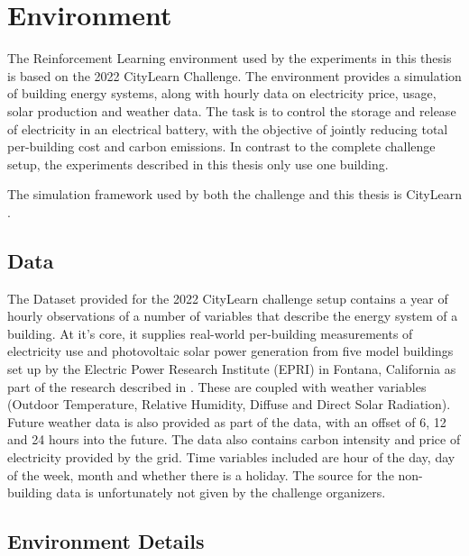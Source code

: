 \section{Environment}
The Reinforcement Learning environment used by the experiments in this thesis is based on the 2022 CityLearn Challenge.
The environment provides a simulation of building energy systems, along with hourly data on electricity price, usage, solar production and weather data.
The task is to control the storage and release of electricity in an electrical battery, with the objective of jointly reducing total per-building cost and carbon emissions.
In contrast to the complete challenge setup, the experiments described in this thesis only use one building.

The simulation framework used by both the challenge and this thesis is CityLearn \cite{vazquez-canteli2019CityLearnV1OpenAI}.

\subsection{Data}
The Dataset provided for the 2022 CityLearn challenge setup contains a year of hourly observations of a number of variables that describe the energy system of a building.
At it's core, it supplies real-world per-building measurements of electricity use and photovoltaic solar power generation from five model buildings set up by the Electric Power Research Institute (EPRI) in Fontana, California as part of the research described in \cite{narayanamurthyGridIntegrationZero}.
These are coupled with weather variables (Outdoor Temperature, Relative Humidity, Diffuse and Direct Solar Radiation).
Future weather data is also provided as part of the data, with an offset of 6, 12 and 24 hours into the future.
The data also contains carbon intensity and price of electricity provided by the grid.
Time variables included are hour of the day, day of the week, month and whether there is a holiday.
The source for the non-building data is unfortunately not given by the challenge organizers.

\subsection{Environment Details}
